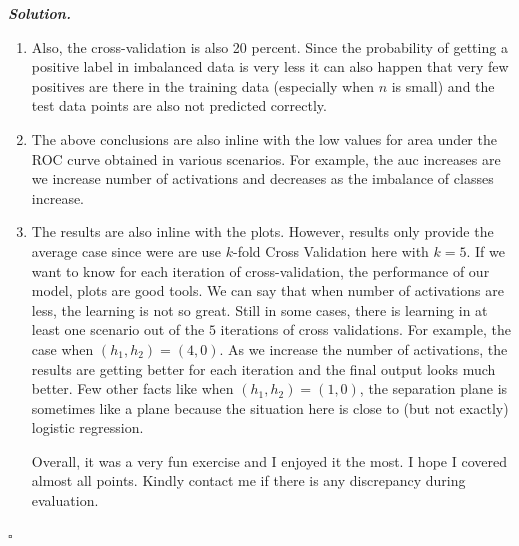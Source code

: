 \documentclass[10pt]{article}
\newenvironment{solution}[1][\it{Solution}]{\textbf{#1. } }{$\square$}
\begin{document}
\begin{solution}
\begin{enumerate}
  \item Also, the cross-validation is also 20 percent. Since the probability of getting a positive label in imbalanced data is very less it can also happen that very few positives are there in the training data (especially when $n$ is small) and the test data points are also not predicted correctly.
  \item The above conclusions are also inline with the low values for area under the ROC curve obtained in various scenarios. For example, the auc increases are we increase number of activations and decreases as the imbalance of classes increase.
  \item The results are also inline with the plots. However, results only provide the average case since were are use $k$-fold Cross Validation here with $k = 5$. If we want to know for each iteration of cross-validation, the performance of our model, plots are good tools. We can say that when number of activations are less, the learning is not so great. Still in some cases, there is learning in at least one scenario out of the $5$ iterations of cross validations. For example, the case when $\left(h_1, h_2\right) = \left(4, 0\right)$. As we increase the number of activations, the results are getting better for each iteration and the final output looks much better. Few other facts like when $\left(h_1, h_2\right) = \left(1, 0\right)$, the separation plane is sometimes like a plane because the situation here is close to (but not exactly) logistic regression.

Overall, it was a very fun exercise and I enjoyed it the most. I hope I covered almost all points. Kindly contact me if there is any discrepancy during evaluation.
\end{enumerate}




\end{solution}
\end{document}
